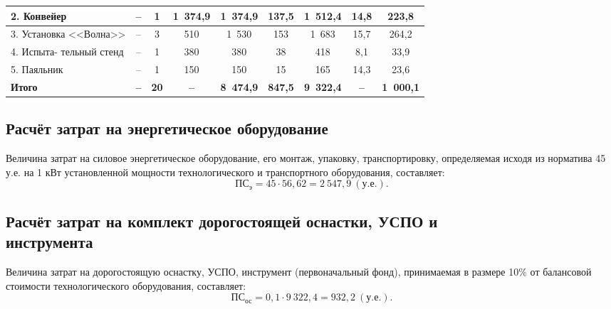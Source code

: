 \begin{table} [h!]
{\begin{tabular}{| m{2.2cm} | c | c | c | c | c | c | c | c |}
      2. Конвейер & --
      & 1
      & 1~374,9 & 1~374,9 & 137,5 & 1~512,4
      & 14,8 & 223,8 \\
      \hline

      3. Установка \newline <<Волна>> & --
      & 3
      & 510 & 1~530 & 153 & 1~683
      & 15,7 & 264,2 \\
      \hline

      4. Испыта- \newline тельный стенд & --
      & 1
      & 380 & 380 & 38 & 418
      & 8,1 & 33,9 \\
      \hline

      5. Паяльник & --
      & 1
      & 150 & 150 & 15 & 165
      & 14,3 & 23,6 \\
      \hline

      \textbf{Итого} & \textbf{--}
      & \textbf{20}
      & \textbf{--} & \textbf{8~474,9} & \textbf{847,5} & \textbf{9~322{,}4}
      & \textbf{--} & \textbf{1~000{,}1} \\
      \hline
    \end{tabular}
  }
\end{table}


\subsection{Расчёт затрат на энергетическое оборудование}

Величина затрат на силовое энергетическое оборудование, его монтаж,
упаковку, транспортировку, определяемая исходя из норматива 45 у.е.
на 1 кВт установленной мощности технологического и транспортного
оборудования, составляет:
\begin{equation*}
  \text{ПС}_{\text{э}} = 45 \cdot 56{,}62 = 2~547{,}9~(\text{у.е.}).
\end{equation*}


\subsection{Расчёт затрат на комплект дорогостоящей оснастки, УСПО и \\
инструмента}

Величина затрат на дорогостоящую оснастку, УСПО,
инструмент (первоначальный фонд), принимаемая в размере 10\% от
балансовой стоимости технологического оборудования, составляет:
\begin{equation*}
  \text{ПС}_{\text{ос}} = 0{,}1 \cdot 9~322{,}4 = 932{,}2 ~(\text{у.е.}).
\end{equation*}


